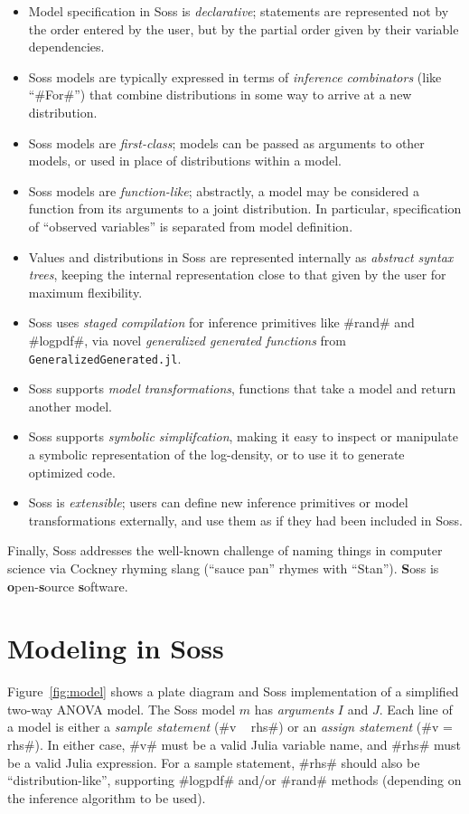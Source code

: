 \documentclass[anonymous=false, %
               format=acmsmall, %
               review=true, %
               screen=true, %
               nonacm=true]{acmart}
\begin{document}
\begin{itemize}
    \item Model specification in Soss is \emph{declarative}; statements are represented not by the order entered by the user, but by the partial order given by their variable dependencies.
    \item Soss models are typically expressed in terms of \emph{inference combinators} (like ``\jl#For#'') that combine distributions in some way to arrive at a new distribution.
    \item Soss models are \emph{first-class}; models can be passed as arguments to other models, or used in place of distributions within a model.
    \item Soss models are \emph{function-like}; abstractly, a model may be considered a function from its arguments to a joint distribution. In particular, specification of ``observed variables'' is separated from model definition.
    \item Values and distributions in Soss are represented internally as \emph{abstract syntax trees}, keeping the internal representation close to that given by the user for maximum flexibility.
    \item Soss uses \emph{staged compilation} for inference primitives like \jl#rand# and \jl#logpdf#, via novel \emph{generalized generated functions} from \texttt{GeneralizedGenerated.jl}.
    \item Soss supports \emph{model transformations}, functions that take a model and return another model.
    \item Soss supports \emph{symbolic simplifcation}, making it easy to inspect or manipulate a symbolic representation of the log-density, or to use it to generate optimized code.
    \item Soss is \emph{extensible}; users can define new inference primitives or model transformations externally, and use them as if they had been included in Soss.
\end{itemize}

Finally, Soss addresses the well-known challenge of naming things in computer science via Cockney rhyming slang (``sauce pan'' rhymes with ``Stan''). {\bf S}oss is {\bf o}pen-{\bf s}ource {\bf s}oftware.

\section{Modeling in Soss}

Figure~\ref{fig:model} shows a plate diagram and Soss implementation of a simplified two-way ANOVA model. The Soss model $m$ has \emph{arguments} $I$ and $J$. Each line of a model is either a \emph{sample statement} (\jl#v ~ rhs#) or an \emph{assign statement} (\jl#v = rhs#). In either case, \jl#v# must be a valid Julia variable name, and \jl#rhs# must be a valid Julia expression. For a sample statement, \jl#rhs# should also be ``distribution-like'', supporting \jl#logpdf# and/or \jl#rand# methods (depending on the inference algorithm to be used).
\end{document}
